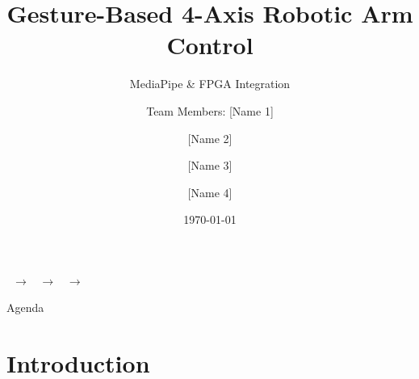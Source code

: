 \documentclass[aspectratio=169]{beamer}
\title[Gesture-Based Robotic Arm]{Gesture-Based 4-Axis Robotic Arm Control}
\subtitle{MediaPipe \& FPGA Integration}
\author{Team Members: [Name 1] \and [Name 2] \and [Name 3] \and [Name 4]}
\institute{[Your Institution]}
\date{\today}
\begin{document}
\begin{frame}
\titlepage
\begin{center}
    \Large \faHandPaper\ $\rightarrow$ \faDesktop\ $\rightarrow$ \faMicrochip\ $\rightarrow$ \faRobot
\end{center}
\end{frame}

\begin{frame}{Agenda}
\tableofcontents
\end{frame}

\section{Introduction}
\end{document}
